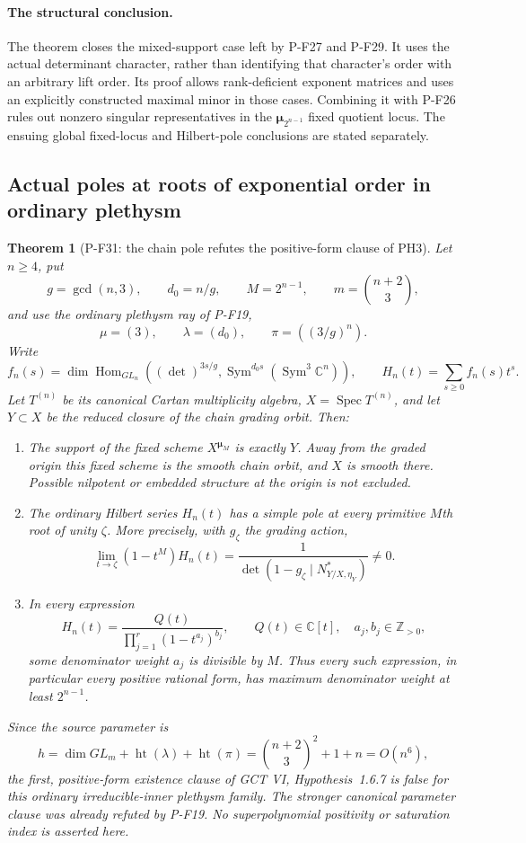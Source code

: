 \documentclass[11pt,a4paper]{article}
\newtheorem{theorem}[proposition]{Theorem}
\begin{document}
\paragraph{The structural conclusion.}
The theorem closes the mixed-support case left by
P-F27 and P-F29. It uses the actual determinant
character, rather than identifying that character's
order with an arbitrary lift order. Its proof
allows rank-deficient exponent matrices and uses
an explicitly constructed maximal minor in those
cases. Combining it with P-F26 rules out
nonzero singular representatives in the
$\boldsymbol\mu_{2^{n-1}}$ fixed quotient locus.
The ensuing global fixed-locus and Hilbert-pole
conclusions are stated separately.


\subsection{Actual poles at roots of exponential order in ordinary plethysm}

\begin{theorem}[P-F31: the chain pole refutes the positive-form clause of PH3]
\label{thm:actualcubicpole}
Let $n\ge4$, put
\[
 g=\gcd(n,3),\qquad d_0=n/g,\qquad
 M=2^{n-1},\qquad m=\binom{n+2}{3},
\]
and use the ordinary plethysm ray of P-F19,
\[
 \mu=(3),\qquad \lambda=(d_0),\qquad
 \pi=((3/g)^n).
\]
Write
\[
 f_n(s)=\dim\operatorname{Hom}_{GL_n}
 \left((\det)^{3s/g},\operatorname{Sym}^{d_0s}
                    (\operatorname{Sym}^3\mathbb C^n)\right),
 \qquad
 H_n(t)=\sum_{s\ge0}f_n(s)t^s.
 \tag{P-F31a}
\]
Let $T^{(n)}$ be its canonical Cartan multiplicity algebra,
$X=\operatorname{Spec}T^{(n)}$, and let $Y\subset X$ be the
reduced closure of the chain grading orbit. Then:

\begin{enumerate}
\item The support of the fixed scheme $X^{\boldsymbol\mu_M}$
is exactly $Y$. Away from the graded origin this fixed scheme
is the smooth chain orbit, and $X$ is smooth there. Possible
nilpotent or embedded structure at the origin is not excluded.
\item The ordinary Hilbert series $H_n(t)$ has a simple pole
at every primitive $M$th root of unity $\zeta$. More precisely,
with $g_\zeta$ the grading action,
\[
 \lim_{t\to\zeta}(1-t^M)H_n(t)
   =\frac{1}{\det(1-g_\zeta\mid N^*_{Y/X,\eta_Y})}
   \ne0.
 \tag{P-F31b}
\]
\item In every expression
\[
 H_n(t)=\frac{Q(t)}{\prod_{j=1}^{r}(1-t^{a_j})^{b_j}},
 \qquad Q(t)\in\mathbb C[t],\quad a_j,b_j\in\mathbb Z_{>0},
 \tag{P-F31c}
\]
some denominator weight $a_j$ is divisible by $M$. Thus every
such expression, in particular every positive rational form,
has maximum denominator weight at least $2^{n-1}$.
\end{enumerate}
Since the source parameter is
\[
 h=\dim GL_m+\operatorname{ht}(\lambda)+\operatorname{ht}(\pi)
   =\binom{n+2}{3}^{\!2}+1+n=O(n^6),
 \tag{P-F31d}
\]
the first, positive-form existence clause of GCT VI,
Hypothesis~1.6.7 is false for this ordinary irreducible-inner
plethysm family. The stronger canonical parameter clause was
already refuted by P-F19. No superpolynomial positivity or
saturation index is asserted here.
\end{theorem}
\end{document}
